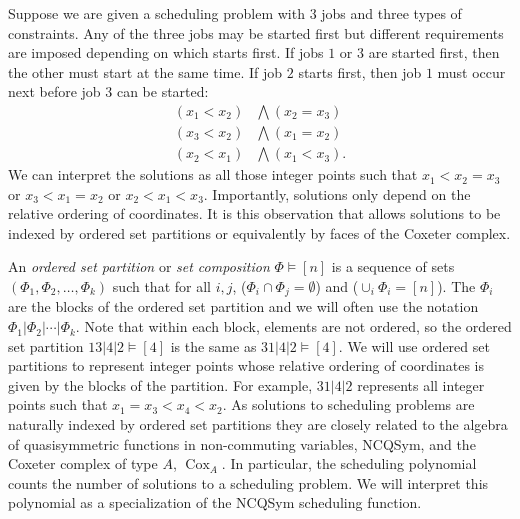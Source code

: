 \documentclass[12pt,reqno]{amsart}
\numberwithin{definition}{section}
\theoremstyle{definition}
\newcommand{\cox}{\operatorname{Cox}}
\begin{document}
Suppose we are given a scheduling problem with $3$ jobs and three types
of constraints. Any of the three jobs may be started first but different
requirements are imposed depending on which starts first.  If jobs $1$ or $3$ are started first, then the other must start at the same time.  If job $2$ starts first, then job $1$ must occur next before job $3$ can be started: 
\begin{align*}
(x_1 < x_2) &\bigwedge (x_2 = x_3)\\
(x_3 < x_2) &\bigwedge (x_1 = x_2)\\
(x_2 < x_1) &\bigwedge (x_1 < x_3).
\end{align*}
We can interpret the solutions as all those integer points such that
$x_1 < x_2 = x_3$ or $x_3 < x_1 = x_2$ or $x_2 < x_1 < x_3$.
Importantly, solutions only depend on the relative ordering of
coordinates.  It is this observation that allows solutions to be
indexed by ordered set partitions or equivalently by faces of the Coxeter complex.


An \emph{ordered set partition} or \emph{set composition} $\Phi \vDash
[n]$ is a sequence of sets $(\Phi_1, \Phi_2, \ldots, \Phi_k)$ such
that for all $i,j$, ($ \Phi_i \cap \Phi_j = \emptyset$) and
($\cup_i \Phi_i = [n]$).  The $\Phi_i$ are the blocks of the ordered
set partition and we will often use the notation $\Phi_1| \Phi_2|
\cdots| \Phi_k$.  Note that within each block, elements are not
ordered, so the ordered set partition $13|4|2 \vDash [4]$ is the same
as $31|4|2 \vDash [4]$.  We will use ordered set partitions to represent integer
points whose relative ordering of coordinates is given by the blocks
of the partition.  For example, $31|4|2$ represents all integer points
such that $x_1 = x_3 < x_4 < x_2$.  As solutions to scheduling
problems are naturally indexed by ordered set partitions they are
closely related to the algebra of quasisymmetric functions in
non-commuting variables, NCQSym, and the Coxeter complex of type $A$,
$\cox_A$. In particular, the scheduling polynomial counts the number
of solutions to a scheduling problem.  We will interpret this
polynomial as a specialization of the NCQSym scheduling function.
\end{document}
